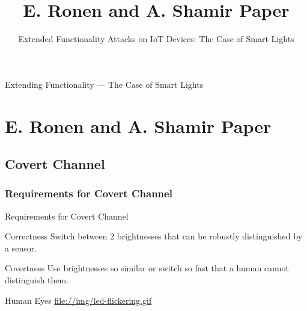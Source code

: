 \documentclass[11pt,t,usepdftitle=false,aspectratio=169]{beamer}
\begin{document}
\begin{frame}{Extending Functionality --- The Case of Smart Lights}
\end{frame}

\title{E. Ronen and A. Shamir Paper}
\subtitle{Extended Functionality Attacks on IoT Devices: The Case of Smart Lights}

\section{E. Ronen and A. Shamir Paper}

\subsection{Covert Channel}%
\label{sub:covert_channel}

\subsubsection{Requirements for Covert Channel}%
\label{sub:requirements_for_covert_channel}
\begin{frame}{Requirements for Covert Channel}
	\begin{block}{Correctness}
		Switch between 2 brightnesses that can be robustly distinguished by a sensor.
	\end{block}
	\begin{block}{Covertness}
		Use brightnesses so similar or switch so fast that a human cannot distinguish them.
	\end{block}
	\begin{block}{Human Eyes}
	    \url{file://img/led-flickering.gif}
	\end{block}
\end{frame}
\end{document}
